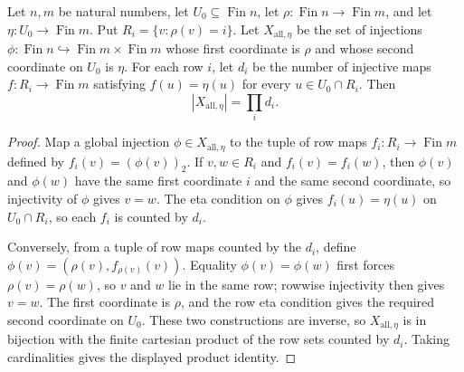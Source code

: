 \begin{helper}
Let \(n,m\) be natural numbers, let \(U_0\subseteq \operatorname{Fin} n\),
let \(\rho:\operatorname{Fin}n\to\operatorname{Fin}m\), and let
\(\eta:U_0\to\operatorname{Fin}m\).  Put \(R_i=\{v:\rho(v)=i\}\).  Let
\(X_{\mathrm{all},\eta}\) be the set of injections
\(\phi:\operatorname{Fin}n\hookrightarrow\operatorname{Fin}m\times
\operatorname{Fin}m\) whose first coordinate is \(\rho\) and whose second
coordinate on \(U_0\) is \(\eta\).  For each row \(i\), let \(d_i\) be the
number of injective maps \(f:R_i\to\operatorname{Fin}m\) satisfying
\(f(u)=\eta(u)\) for every \(u\in U_0\cap R_i\).  Then
\[
|X_{\mathrm{all},\eta}|=\prod_i d_i.
\]
\end{helper}
\begin{proof}
Map a global injection \(\phi\in X_{\mathrm{all},\eta}\) to the tuple of
row maps \(f_i:R_i\to\operatorname{Fin}m\) defined by
\(f_i(v)=(\phi(v))_2\).  If \(v,w\in R_i\) and \(f_i(v)=f_i(w)\), then
\(\phi(v)\) and \(\phi(w)\) have the same first coordinate \(i\) and the
same second coordinate, so injectivity of \(\phi\) gives \(v=w\).  The eta
condition on \(\phi\) gives \(f_i(u)=\eta(u)\) on \(U_0\cap R_i\), so each
\(f_i\) is counted by \(d_i\).

Conversely, from a tuple of row maps counted by the \(d_i\), define
\(\phi(v)=(\rho(v),f_{\rho(v)}(v))\).  Equality \(\phi(v)=\phi(w)\) first
forces \(\rho(v)=\rho(w)\), so \(v\) and \(w\) lie in the same row; rowwise
injectivity then gives \(v=w\).  The first coordinate is \(\rho\), and the
row eta condition gives the required second coordinate on \(U_0\).  These
two constructions are inverse, so \(X_{\mathrm{all},\eta}\) is in bijection
with the finite cartesian product of the row sets counted by \(d_i\).
Taking cardinalities gives the displayed product identity.
\end{proof}
